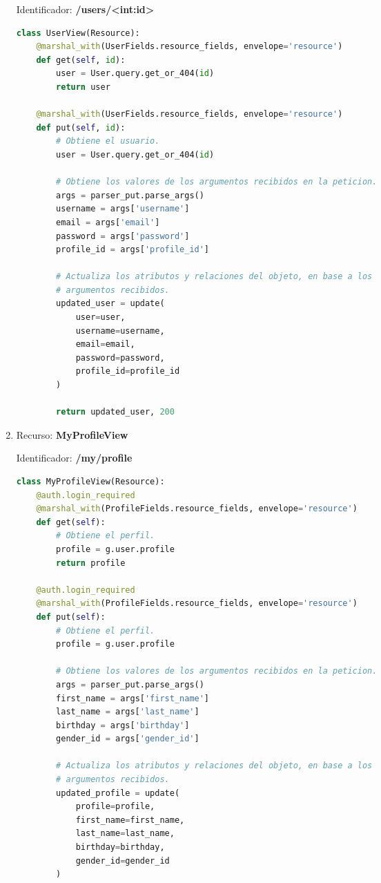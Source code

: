 \documentclass[a4paper,12pt]{article}
\begin{document}
\begin{enumerate}
Identificador: \textbf{/users/<int:id>}

\begin{lstlisting}[language=Python]
class UserView(Resource):
    @marshal_with(UserFields.resource_fields, envelope='resource')
    def get(self, id):
        user = User.query.get_or_404(id)
        return user

    @marshal_with(UserFields.resource_fields, envelope='resource')
    def put(self, id):
        # Obtiene el usuario.
        user = User.query.get_or_404(id)

        # Obtiene los valores de los argumentos recibidos en la peticion.
        args = parser_put.parse_args()
        username = args['username']
        email = args['email']
        password = args['password']
        profile_id = args['profile_id']

        # Actualiza los atributos y relaciones del objeto, en base a los
        # argumentos recibidos.
        updated_user = update(
            user=user,
            username=username,
            email=email,
            password=password,
            profile_id=profile_id
        )

        return updated_user, 200
\end{lstlisting}

\item Recurso: \textbf{MyProfileView}

Identificador: \textbf{/my/profile}

\begin{lstlisting}[language=Python]
class MyProfileView(Resource):
    @auth.login_required
    @marshal_with(ProfileFields.resource_fields, envelope='resource')
    def get(self):
        # Obtiene el perfil.
        profile = g.user.profile
        return profile

    @auth.login_required
    @marshal_with(ProfileFields.resource_fields, envelope='resource')
    def put(self):
        # Obtiene el perfil.
        profile = g.user.profile

        # Obtiene los valores de los argumentos recibidos en la peticion.
        args = parser_put.parse_args()
        first_name = args['first_name']
        last_name = args['last_name']
        birthday = args['birthday']
        gender_id = args['gender_id']

        # Actualiza los atributos y relaciones del objeto, en base a los
        # argumentos recibidos.
        updated_profile = update(
            profile=profile,
            first_name=first_name,
            last_name=last_name,
            birthday=birthday,
            gender_id=gender_id
        )


\end{lstlisting}
\end{enumerate}
\end{document}
